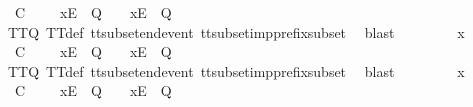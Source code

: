 \begin{isabellebody}
\ {\isachardoublequoteopen}{\isasymrho}{\isacharprime}\ {\isasymsubseteq}\isactrlsub C\ {\isasymrho}{\isacharprime}{\isacharprime}\ {\isasymLongrightarrow}\ {\isasymrho}{\isacharprime}{\isacharprime}\ {\isacharat}\ {\isacharbrackleft}{\isacharbrackleft}x{\isacharbrackright}\isactrlsub E{\isacharbrackright}\ {\isasymin}\ Q\ {\isasymLongrightarrow}\ {\isasymrho}{\isacharprime}\ {\isacharat}\ {\isacharbrackleft}{\isacharbrackleft}x{\isacharbrackright}\isactrlsub E{\isacharbrackright}\ {\isasymin}\ Q{\isachardoublequoteclose}\isanewline
\ \ \ \ \ \ \isamarkupfalse%
\ TT{}{\isacharunderscore}Q\ TT{}{\isacharunderscore}def\ tt{\isacharunderscore}subset{\isacharunderscore}end{\isacharunderscore}event\ tt{\isacharunderscore}subset{\isacharunderscore}imp{\isacharunderscore}prefix{\isacharunderscore}subset\ \isamarkupfalse%
\ blast\isanewline
\ \ \isamarkupfalse%
\isanewline
\ \ \ \ \isamarkupfalse%
\ x\isanewline
\ \ \ \ \isamarkupfalse%
\ {\isachardoublequoteopen}{\isasymrho}{\isacharprime}\ {\isasymsubseteq}\isactrlsub C\ {\isasymrho}{\isacharprime}{\isacharprime}\ {\isasymLongrightarrow}\ {\isasymrho}{\isacharprime}{\isacharprime}\ {\isacharat}\ {\isacharbrackleft}{\isacharbrackleft}x{\isacharbrackright}\isactrlsub E{\isacharbrackright}\ {\isasymin}\ Q\ {\isasymLongrightarrow}\ {\isasymrho}{\isacharprime}\ {\isacharat}\ {\isacharbrackleft}{\isacharbrackleft}x{\isacharbrackright}\isactrlsub E{\isacharbrackright}\ {\isasymin}\ Q{\isachardoublequoteclose}\isanewline
\ \ \ \ \ \ \isamarkupfalse%
\ TT{}{\isacharunderscore}Q\ TT{}{\isacharunderscore}def\ tt{\isacharunderscore}subset{\isacharunderscore}end{\isacharunderscore}event\ tt{\isacharunderscore}subset{\isacharunderscore}imp{\isacharunderscore}prefix{\isacharunderscore}subset\ \isamarkupfalse%
\ blast\isanewline
\ \ \isamarkupfalse%
\isanewline
\ \ \ \ \isamarkupfalse%
\ x\isanewline
\ \ \ \ \isamarkupfalse%
\ {\isachardoublequoteopen}{\isasymrho}{\isacharprime}\ {\isasymsubseteq}\isactrlsub C\ {\isasymrho}{\isacharprime}{\isacharprime}\ {\isasymLongrightarrow}\ {\isasymrho}{\isacharprime}{\isacharprime}\ {\isacharat}\ {\isacharbrackleft}{\isacharbrackleft}x{\isacharbrackright}\isactrlsub E{\isacharbrackright}\ {\isasymin}\ Q\ {\isasymLongrightarrow}\ {\isasymrho}{\isacharprime}\ {\isacharat}\ {\isacharbrackleft}{\isacharbrackleft}x{\isacharbrackright}\isactrlsub E{\isacharbrackright}\ {\isasymin}\ Q{\isachardoublequoteclose}\isanewline

\end{isabellebody}
